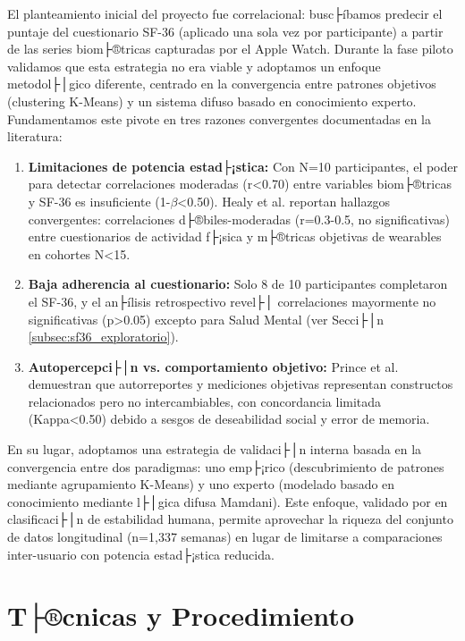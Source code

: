 El planteamiento inicial del proyecto fue correlacional: busc├íbamos predecir el puntaje del cuestionario SF-36 (aplicado una sola vez por participante) a partir de las series biom├®tricas capturadas por el Apple Watch. Durante la fase piloto validamos que esta estrategia no era viable y adoptamos un enfoque metodol├│gico diferente, centrado en la convergencia entre patrones objetivos (clustering K-Means) y un sistema difuso basado en conocimiento experto. Fundamentamos este pivote en tres razones convergentes documentadas en la literatura:

\begin{enumerate}
    \item \textbf{Limitaciones de potencia estad├¡stica:} Con N=10 participantes, el poder para detectar correlaciones moderadas (r<0.70) entre variables biom├®tricas y SF-36 es insuficiente (1-$\beta$<0.50). Healy et al. \cite{Healy2024} reportan hallazgos convergentes: correlaciones d├®biles-moderadas (r=0.3-0.5, no significativas) entre cuestionarios de actividad f├¡sica y m├®tricas objetivas de wearables en cohortes N<15.
    
    \item \textbf{Baja adherencia al cuestionario:} Solo 8 de 10 participantes completaron el SF-36, y el an├ílisis retrospectivo revel├│ correlaciones mayormente no significativas (p>0.05) excepto para Salud Mental (ver Secci├│n \ref{subsec:sf36_exploratorio}).
    
    \item \textbf{Autopercepci├│n vs. comportamiento objetivo:} Prince et al. \cite{Prince2008} demuestran que autorreportes y mediciones objetivas representan constructos relacionados pero no intercambiables, con concordancia limitada (Kappa<0.50) debido a sesgos de deseabilidad social y error de memoria.
\end{enumerate}

En su lugar, adoptamos una estrategia de validaci├│n interna basada en la convergencia entre dos paradigmas: uno emp├¡rico (descubrimiento de patrones mediante agrupamiento K-Means) y uno experto (modelado basado en conocimiento mediante l├│gica difusa Mamdani). Este enfoque, validado por \cite{Goncalves2021} en clasificaci├│n de estabilidad humana, permite aprovechar la riqueza del conjunto de datos longitudinal (n=1,337 semanas) en lugar de limitarse a comparaciones inter-usuario con potencia estad├¡stica reducida.

\section{T├®cnicas y Procedimiento}
\label{sec:tecnicas_procedimiento}

